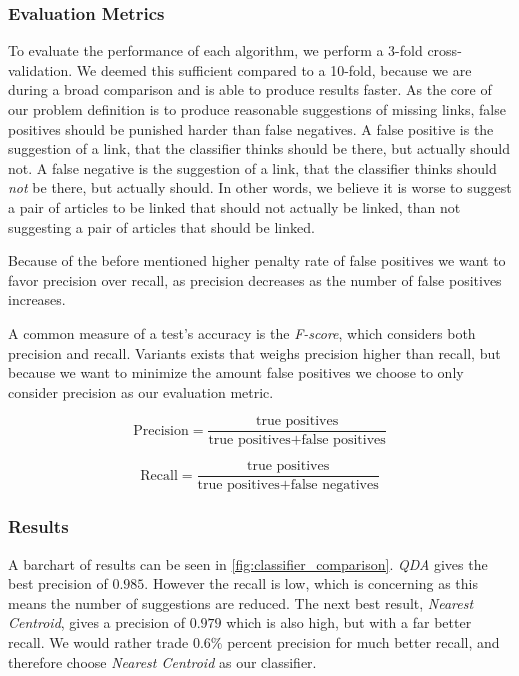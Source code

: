 \subsubsection{Evaluation Metrics}\label{evaluation_metric}
To evaluate the performance of each algorithm, we perform a 3-fold cross-validation. We deemed this sufficient compared to a 10-fold, because we are during a broad comparison and is able to produce results faster.
As the core of our problem definition is to produce reasonable suggestions of missing links, false positives should be punished harder than false negatives. A false positive is the suggestion of a link, that the classifier thinks should be there, but actually should not. A false negative is the suggestion of a link, that the classifier thinks should \emph{not} be there, but actually should. In other words, we believe it is worse to suggest a pair of articles to be linked that should not actually be linked, than not suggesting a pair of articles that should be linked. 

Because of the before mentioned higher penalty rate of false positives we want to favor precision over recall, as precision decreases as the number of false positives increases.

A common measure of a test's accuracy is the \emph{F-score}, which considers both precision and recall. Variants exists that weighs precision higher than recall, but because we want to minimize the amount false positives we choose to only consider precision as our evaluation metric.

\begin{equation}\label{eq:precision}
\text{Precision} = \frac{\text{true positives}}{\text{true positives} + \text{false positives}}
\end{equation}

\begin{equation}\label{eq:recall}
\text{Recall} = \frac{\text{true positives}}{\text{true positives} + \text{false negatives}}
\end{equation}


\subsubsection{Results}
A barchart of results can be seen in \cref{fig:classifier_comparison}. \emph{QDA} gives the best precision of $0.985$. However the recall is low, which is concerning as this means the number of suggestions are reduced. The next best result, \emph{Nearest Centroid}, gives a precision of $0.979$ which is also high, but with a far better recall. We would rather trade $0.6\%$ percent precision for much better recall, and therefore choose \emph{Nearest Centroid} as our classifier.

